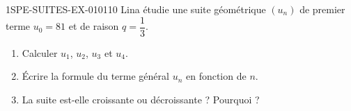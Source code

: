 \begin{exercice}{1SPE-SUITES-EX-010}{1}{10}
Lina étudie une suite géométrique $(u_n)$ de premier terme $u_0 = 81$ et de raison $q = \dfrac{1}{3}$.
\begin{enumerate}
  \item Calculer $u_1$, $u_2$, $u_3$ et $u_4$.
  \item Écrire la formule du terme général $u_n$ en fonction de $n$.
  \item La suite est-elle croissante ou décroissante ? Pourquoi ?
\end{enumerate}
\end{exercice}
